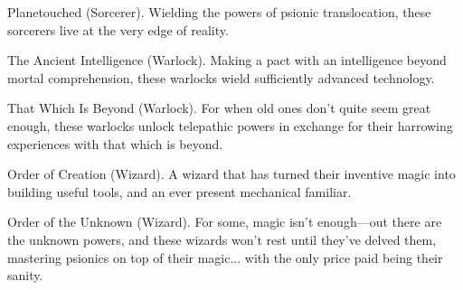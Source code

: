 \documentclass[11pt,twoside,openany]{book}  %
\begin{document}
\begin{fiveitemize}
	\item Planetouched (Sorcerer). Wielding the powers of psionic translocation, these sorcerers live at the very edge of reality.
	\item The Ancient Intelligence (Warlock). Making a pact with an intelligence beyond mortal comprehension, these warlocks wield sufficiently advanced technology.
	\item That Which Is Beyond (Warlock). For when old ones don’t quite seem great enough, these warlocks unlock telepathic powers in exchange for their harrowing experiences with that which is beyond.
	\item Order of Creation (Wizard). A wizard that has turned their inventive magic into building useful tools, and an ever present mechanical familiar.
	\item Order of the Unknown (Wizard). For some, magic isn’t enough—out there are the unknown powers, and these wizards won’t rest until they’ve delved them, mastering psionics on top of their magic... with the only price paid being their sanity.
\end{fiveitemize}
\end{document}
